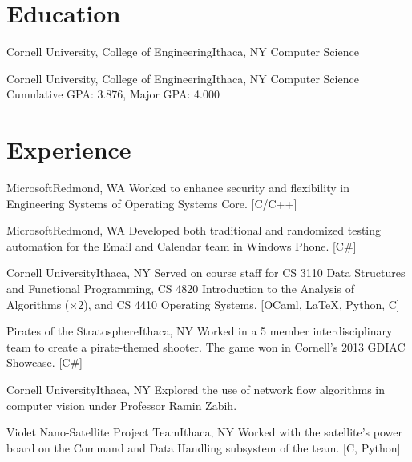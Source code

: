 \documentclass[11pt,letterpaper,sans]{moderncv}
\begin{document}
\makecvtitle

\section{Education}

{Cornell University, \mdseries College of Engineering}{Ithaca, NY}
{Computer Science}
{}\medskip

{Cornell University, \mdseries College of Engineering}{Ithaca, NY}
{Computer Science}
{Cumulative GPA: 3.876, Major GPA: 4.000}
\medskip


\section{Experience}

{Microsoft}{Redmond, WA}
{}
{Worked to enhance security and flexibility in Engineering Systems of Operating Systems Core. [C/C++]}
\medskip

{Microsoft}{Redmond, WA}
{}
{Developed both traditional and randomized testing automation for the Email and Calendar team in Windows Phone. [C\#]}
\medskip

{Cornell University}{Ithaca, NY}
{}
{Served on course staff for CS 3110 Data Structures and Functional Programming, CS 4820 Introduction to the Analysis of Algorithms ($\times$2), and CS 4410 Operating Systems. [OCaml, \LaTeX, Python, C]}
\medskip

{Pirates of the Stratosphere}{Ithaca, NY}
{}
{Worked in a 5 member interdisciplinary team to create a pirate-themed shooter. The game won in Cornell's 2013 GDIAC Showcase. [C\#]}
\medskip

{Cornell University}{Ithaca, NY}
{}
{Explored the use of network flow algorithms in computer vision under Professor Ramin Zabih.}
\medskip

{Violet Nano-Satellite Project Team}{Ithaca, NY}
{}
{Worked with the satellite's power board on the Command and Data Handling subsystem of the team. [C, Python]}
\medskip
\end{document}
